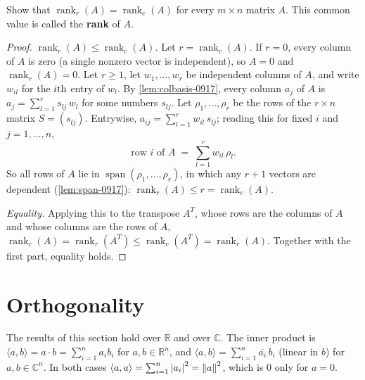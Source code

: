 \begin{exercisebox}
\begin{exercise}\label{ex:rank-equal-0917}\label{thm:rank-equal-0917}
    Show that $\operatorname{rank}_r(A) = \operatorname{rank}_c(A)$ for every $m \times n$ matrix $A$. This
    common value is called the \textbf{rank} of $A$.
\end{exercise}
\tcblower
\begin{proof}
    \emph{$\operatorname{rank}_r(A) \leq \operatorname{rank}_c(A)$.} Let
    $r = \operatorname{rank}_c(A)$. If $r = 0$, every column of $A$ is zero (a single nonzero vector
    is independent), so $A = 0$ and $\operatorname{rank}_r(A) = 0$. Let $r \geq 1$, let
    $w_1, \dots, w_r$ be independent columns of $A$, and write $w_{il}$ for the $i\text{th}$ entry of
    $w_l$. By \cref{lem:colbasis-0917}, every column $a_j$ of $A$ is
    $a_j = \sum_{l=1}^{r} s_{lj} \, w_l$ for some numbers $s_{lj}$. Let $\rho_1, \dots, \rho_r$ be the
    rows of the $r \times n$ matrix $S = (s_{lj})$. Entrywise, $a_{ij} = \sum_{l=1}^{r} w_{il} \, s_{lj}$;
    reading this for fixed $i$ and $j = 1, \dots, n$,
    \[\text{row $i$ of $A$} \;=\; \sum_{l=1}^{r} w_{il} \, \rho_l.\]
    So all rows of $A$ lie in $\operatorname{span}(\rho_1, \dots, \rho_r)$, in which any $r + 1$ vectors
    are dependent (\cref{lem:span-0917}): $\operatorname{rank}_r(A) \leq r = \operatorname{rank}_c(A)$.

    \emph{Equality.} Applying this to the transpose $A^{T}$, whose rows are the columns of $A$ and whose
    columns are the rows of $A$,
    $\operatorname{rank}_c(A) = \operatorname{rank}_r(A^{T}) \leq \operatorname{rank}_c(A^{T})
        = \operatorname{rank}_r(A)$. Together with the first part, equality holds.
\end{proof}
\end{exercisebox}

\section{Orthogonality}

The results of this section hold over $\mathbb{R}$ and over $\mathbb{C}$. The inner product is
$\langle a, b \rangle = a \cdot b = \sum_{i=1}^{n} a_i b_i$ for $a, b \in \mathbb{R}^n$, and
$\langle a, b \rangle = \sum_{i=1}^{n} \overline{a_i} \, b_i$ (linear in $b$) for $a, b \in \mathbb{C}^n$.
In both cases $\langle a, a \rangle = \sum_{i=1}^{n} \left\lvert a_i\right\rvert^2 = \left\lVert a \right\rVert^2$, which is $0$ only for
$a = 0$.

